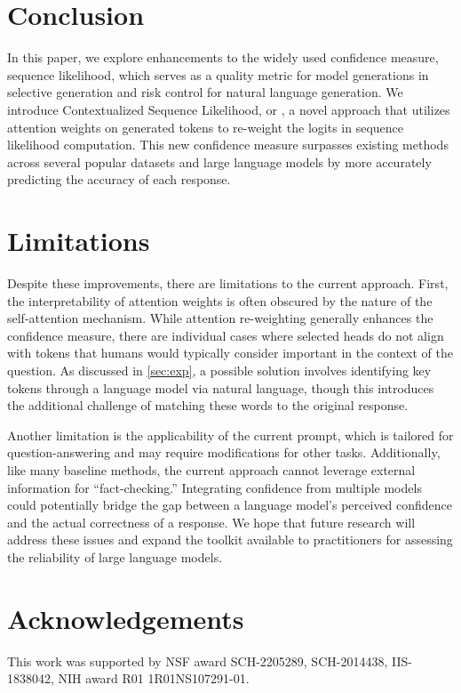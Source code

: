 \documentclass[11pt]{article}
\begin{document}
\section{Conclusion}\label{sec:conclusion}
In this paper, we explore enhancements to the widely used confidence measure, sequence likelihood, which serves as a quality metric for model generations in selective generation and risk control for natural language generation. 
We introduce Contextualized Sequence Likelihood, or \methodname, a novel approach that utilizes attention weights on generated tokens to re-weight the logits in sequence likelihood computation. 
This new confidence measure surpasses existing methods across several popular datasets and large language models by more accurately predicting the accuracy of each response.


\section{Limitations}\label{sec:limitations}
Despite these improvements, there are limitations to the current approach. 
First, the interpretability of attention weights is often obscured by the nature of the self-attention mechanism. 
While attention re-weighting generally enhances the confidence measure, there are individual cases where selected heads do not align with tokens that humans would typically consider important in the context of the question. 
As discussed in \cref{sec:exp}, a possible solution involves identifying key tokens through a language model via natural language, though this introduces the additional challenge of matching these words to the original response.

Another limitation is the applicability of the current prompt, which is tailored for question-answering and may require modifications for other tasks.
Additionally, like many baseline methods, the current approach cannot leverage external information for ``fact-checking.'' 
Integrating confidence from multiple models could potentially bridge the gap between a language model's perceived confidence and the actual correctness of a response.
We hope that future research will address these issues and expand the toolkit available to practitioners for assessing the reliability of large language models.


\section*{Acknowledgements}
This work was supported by NSF award SCH-2205289, SCH-2014438, IIS-1838042, NIH award R01 1R01NS107291-01.
\end{document}
